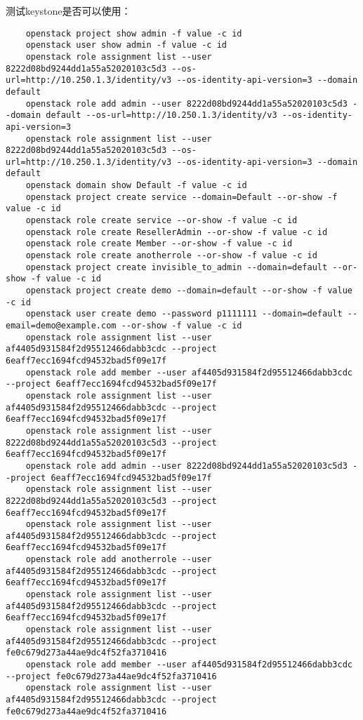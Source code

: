 \documentclass[a4paper,left=1.5cm,right=1.5cm,11pt]{article}
\begin{document}
	测试keystone是否可以使用：
	\begin{lstlisting}
	openstack project show admin -f value -c id
	openstack user show admin -f value -c id
	openstack role assignment list --user 8222d08bd9244dd1a55a52020103c5d3 --os-url=http://10.250.1.3/identity/v3 --os-identity-api-version=3 --domain default
	openstack role add admin --user 8222d08bd9244dd1a55a52020103c5d3 --domain default --os-url=http://10.250.1.3/identity/v3 --os-identity-api-version=3
	openstack role assignment list --user 8222d08bd9244dd1a55a52020103c5d3 --os-url=http://10.250.1.3/identity/v3 --os-identity-api-version=3 --domain default
	openstack domain show Default -f value -c id
	openstack project create service --domain=Default --or-show -f value -c id
	openstack role create service --or-show -f value -c id
	openstack role create ResellerAdmin --or-show -f value -c id
	openstack role create Member --or-show -f value -c id
	openstack role create anotherrole --or-show -f value -c id
	openstack project create invisible_to_admin --domain=default --or-show -f value -c id
	openstack project create demo --domain=default --or-show -f value -c id
	openstack user create demo --password p1111111 --domain=default --email=demo@example.com --or-show -f value -c id
	openstack role assignment list --user af4405d931584f2d95512466dabb3cdc --project 6eaff7ecc1694fcd94532bad5f09e17f
	openstack role add member --user af4405d931584f2d95512466dabb3cdc --project 6eaff7ecc1694fcd94532bad5f09e17f
	openstack role assignment list --user af4405d931584f2d95512466dabb3cdc --project 6eaff7ecc1694fcd94532bad5f09e17f
	openstack role assignment list --user 8222d08bd9244dd1a55a52020103c5d3 --project 6eaff7ecc1694fcd94532bad5f09e17f
	openstack role add admin --user 8222d08bd9244dd1a55a52020103c5d3 --project 6eaff7ecc1694fcd94532bad5f09e17f
	openstack role assignment list --user 8222d08bd9244dd1a55a52020103c5d3 --project 6eaff7ecc1694fcd94532bad5f09e17f
	openstack role assignment list --user af4405d931584f2d95512466dabb3cdc --project 6eaff7ecc1694fcd94532bad5f09e17f
	openstack role add anotherrole --user af4405d931584f2d95512466dabb3cdc --project 6eaff7ecc1694fcd94532bad5f09e17f
	openstack role assignment list --user af4405d931584f2d95512466dabb3cdc --project 6eaff7ecc1694fcd94532bad5f09e17f
	openstack role assignment list --user af4405d931584f2d95512466dabb3cdc --project fe0c679d273a44ae9dc4f52fa3710416
	openstack role add member --user af4405d931584f2d95512466dabb3cdc --project fe0c679d273a44ae9dc4f52fa3710416
	openstack role assignment list --user af4405d931584f2d95512466dabb3cdc --project fe0c679d273a44ae9dc4f52fa3710416

\end{lstlisting}
\end{document}
